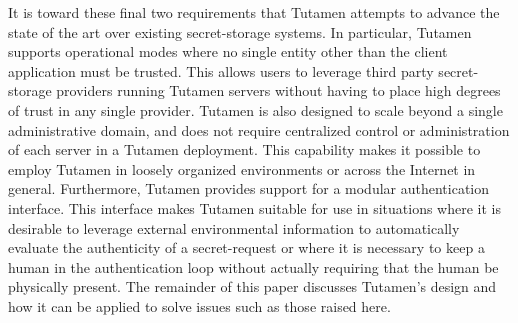 It is toward these final two requirements that Tutamen attempts to
advance the state of the art over existing secret-storage systems. In
particular, Tutamen supports operational modes where no single entity
other than the client application must be trusted. This allows users
to leverage third party secret-storage providers running Tutamen
servers without having to place high degrees of trust in any single
provider. Tutamen is also designed to scale beyond a single
administrative domain, and does not require centralized control or
administration of each server in a Tutamen deployment. This capability
makes it possible to employ Tutamen in loosely organized environments
or across the Internet in general. Furthermore, Tutamen provides
support for a modular authentication interface. This interface makes
Tutamen suitable for use in situations where it is desirable to
leverage external environmental information to automatically evaluate
the authenticity of a secret-request or where it is necessary to keep
a human in the authentication loop without actually requiring that the
human be physically present. The remainder of this paper discusses
Tutamen's design and how it can be applied to solve issues such as
those raised here.

